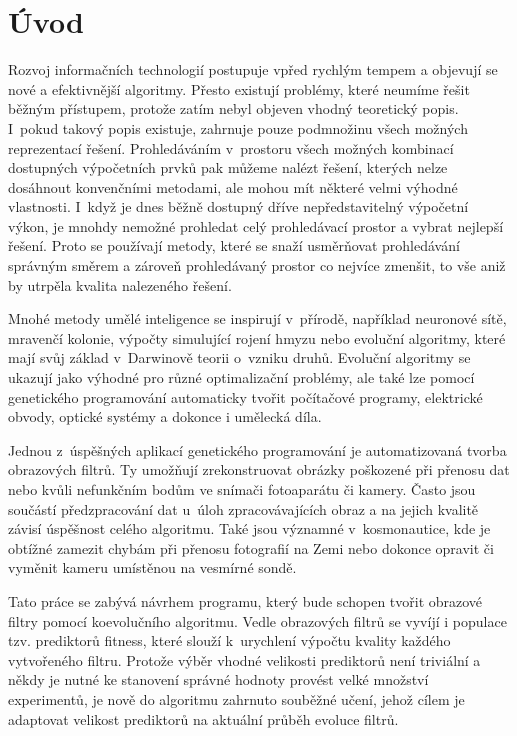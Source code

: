 
\chapter{Úvod}

Rozvoj informačních technologií postupuje vpřed rychlým tempem a objevují se nové a efektivnější algoritmy. Přesto existují problémy, které neumíme řešit běžným  přístupem, protože zatím nebyl objeven vhodný teoretický popis. I~pokud takový popis existuje, zahrnuje pouze podmnožinu všech možných reprezentací řešení. Prohledáváním v~prostoru všech možných kombinací dostupných výpočetních prvků pak můžeme nalézt řešení, kterých nelze dosáhnout konvenčními metodami, ale mohou mít některé velmi výhodné vlastnosti. I~když je dnes běžně dostupný dříve nepředstavitelný výpočetní výkon, je mnohdy nemožné prohledat celý prohledávací prostor a vybrat nejlepší řešení. Proto se používají metody, které se snaží usměrňovat prohledávání správným směrem a zároveň prohledávaný prostor co nejvíce zmenšit, to vše aniž by utrpěla kvalita nalezeného řešení.

Mnohé metody umělé inteligence se inspirují v~přírodě, například neuronové sítě, mravenčí kolonie, výpočty simulující rojení hmyzu nebo evoluční algoritmy, které mají svůj základ v~Darwinově teorii o~vzniku druhů. Evoluční algoritmy se ukazují jako výhodné pro různé optimalizační problémy, ale také lze pomocí genetického programování automaticky tvořit počítačové programy, elektrické obvody, optické systémy a dokonce i umělecká díla.

Jednou z~úspěšných aplikací genetického programování je automatizovaná tvorba obrazových filtrů. Ty umožňují zrekonstruovat obrázky poškozené při přenosu dat nebo kvůli nefunkčním bodům ve snímači fotoaparátu či kamery. Často jsou součástí předzpracování dat u~úloh zpracovávajících obraz a na jejich kvalitě závisí úspěšnost celého algoritmu. Také jsou významné v~kosmonautice, kde je obtížné zamezit chybám při přenosu fotografií na Zemi nebo dokonce opravit či vyměnit kameru umístěnou na vesmírné sondě.

Tato práce se zabývá návrhem programu, který bude schopen tvořit obrazové filtry pomocí koevolučního algoritmu. Vedle obrazových filtrů se vyvíjí i populace tzv. prediktorů fitness, které slouží k~urychlení výpočtu kvality každého vytvořeného filtru. Protože výběr vhodné velikosti prediktorů není triviální a někdy je nutné ke stanovení správné hodnoty provést velké množství experimentů, je nově do algoritmu zahrnuto souběžné učení, jehož cílem je adaptovat velikost prediktorů na aktuální průběh evoluce filtrů.

